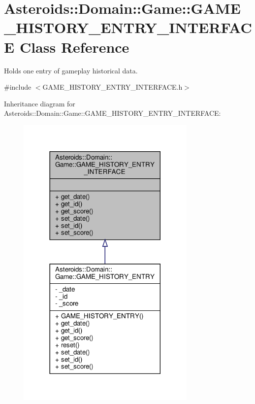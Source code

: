 \hypertarget{classAsteroids_1_1Domain_1_1Game_1_1GAME__HISTORY__ENTRY__INTERFACE}{}\section{Asteroids\+:\+:Domain\+:\+:Game\+:\+:G\+A\+M\+E\+\_\+\+H\+I\+S\+T\+O\+R\+Y\+\_\+\+E\+N\+T\+R\+Y\+\_\+\+I\+N\+T\+E\+R\+F\+A\+CE Class Reference}
\label{classAsteroids_1_1Domain_1_1Game_1_1GAME__HISTORY__ENTRY__INTERFACE}


Holds one entry of gameplay historical data.  




{\ttfamily \#include $<$G\+A\+M\+E\+\_\+\+H\+I\+S\+T\+O\+R\+Y\+\_\+\+E\+N\+T\+R\+Y\+\_\+\+I\+N\+T\+E\+R\+F\+A\+C\+E.\+h$>$}



Inheritance diagram for Asteroids\+:\+:Domain\+:\+:Game\+:\+:G\+A\+M\+E\+\_\+\+H\+I\+S\+T\+O\+R\+Y\+\_\+\+E\+N\+T\+R\+Y\+\_\+\+I\+N\+T\+E\+R\+F\+A\+CE\+:\nopagebreak
\begin{figure}[H]
\begin{center}
\leavevmode
\includegraphics[width=248pt]{classAsteroids_1_1Domain_1_1Game_1_1GAME__HISTORY__ENTRY__INTERFACE__inherit__graph}
\end{center}
\end{figure}


